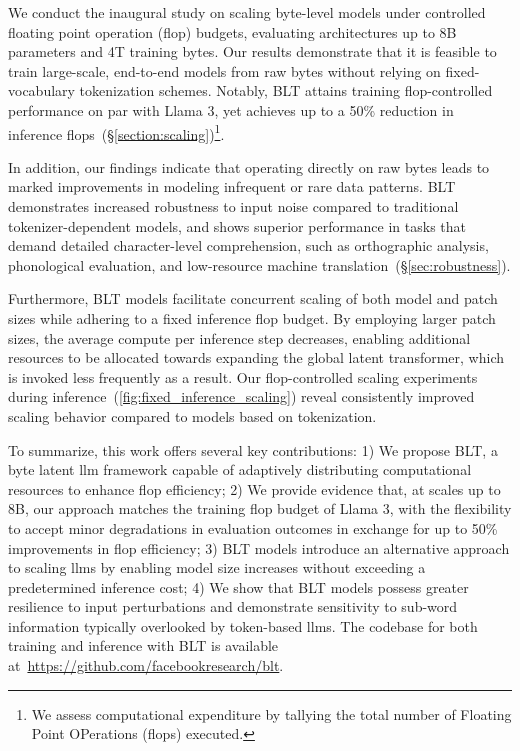 We conduct the inaugural study on scaling byte-level models under controlled floating point operation (flop) budgets, evaluating architectures up to 8B parameters and 4T training bytes. Our results demonstrate that it is feasible to train large-scale, end-to-end models from raw bytes without relying on fixed-vocabulary tokenization schemes. Notably, {\textsc BLT} attains training flop-controlled performance on par with Llama 3, yet achieves up to a 50\% reduction in inference flops~(\S\ref{section:scaling})\footnote{We assess computational expenditure by tallying the total number of Floating Point OPerations (flops) executed.}. 

In addition, our findings indicate that operating directly on raw bytes leads to marked improvements in modeling infrequent or rare data patterns. {\textsc BLT} demonstrates increased robustness to input noise compared to traditional tokenizer-dependent models, and shows superior performance in tasks that demand detailed character-level comprehension, such as orthographic analysis, phonological evaluation, and low-resource machine translation~(\S\ref{sec:robustness}).

Furthermore, {\textsc BLT} models facilitate concurrent scaling of both model and patch sizes while adhering to a fixed inference flop budget. By employing larger patch sizes, the average compute per inference step decreases, enabling additional resources to be allocated towards expanding the global latent transformer, which is invoked less frequently as a result. Our flop-controlled scaling experiments during inference~(\autoref{fig:fixed_inference_scaling}) reveal consistently improved scaling behavior compared to models based on tokenization.

To summarize, this work offers several key contributions: 1) We propose {\textsc BLT}, a byte latent llm framework capable of adaptively distributing computational resources to enhance flop efficiency; 2) We provide evidence that, at scales up to 8B, our approach matches the training flop budget of Llama 3, with the flexibility to accept minor degradations in evaluation outcomes in exchange for up to 50\% improvements in flop efficiency; 3) {\textsc BLT} models introduce an alternative approach to scaling llms by enabling model size increases without exceeding a predetermined inference cost; 4) We show that {\textsc BLT} models possess greater resilience to input perturbations and demonstrate sensitivity to sub-word information typically overlooked by token-based llms. The codebase for both training and inference with {\textsc BLT} is available at~\url{https://github.com/facebookresearch/blt}.

